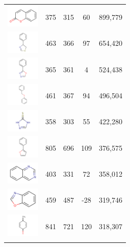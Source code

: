 \begin{longtable}{ccccc}
\includegraphics[width=60px]{data/badapple/scaf_07.png} & 375 & 315 & 60 & 899,779\\
\includegraphics[width=60px]{data/badapple/scaf_08.png} & 463 & 366 & 97 & 654,420\\
\includegraphics[width=60px]{data/badapple/scaf_09.png} & 365 & 361 & 4 & 524,438\\
\includegraphics[width=60px]{data/badapple/scaf_10.png} & 461 & 367 & 94 & 496,504\\
\includegraphics[width=60px]{data/badapple/scaf_11.png} & 358 & 303 & 55 & 422,280\\
\includegraphics[width=60px]{data/badapple/scaf_12.png} & 805 & 696 & 109 & 376,575\\
\includegraphics[width=60px]{data/badapple/scaf_13.png} & 403 & 331 & 72 & 358,012\\
\includegraphics[width=60px]{data/badapple/scaf_14.png} & 459 & 487 & -28 & 319,746\\
\includegraphics[width=60px]{data/badapple/scaf_15.png} & 841 & 721 & 120 & 318,307\\
\hline
\label{table:ba_cmp_retro}
\end{longtable}


